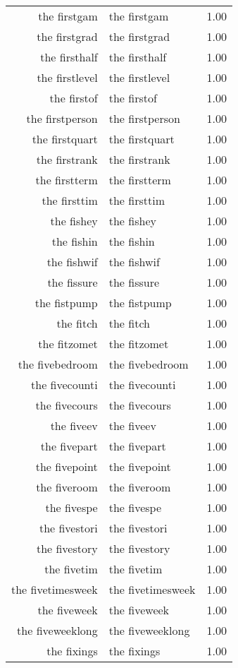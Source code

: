 \begin{table}[ht]
\begin{tabular}{rlr}
  the firstgam & the firstgam & 1.00 \\ 
  the firstgrad & the firstgrad & 1.00 \\ 
  the firsthalf & the firsthalf & 1.00 \\ 
  the firstlevel & the firstlevel & 1.00 \\ 
  the firstof & the firstof & 1.00 \\ 
  the firstperson & the firstperson & 1.00 \\ 
  the firstquart & the firstquart & 1.00 \\ 
  the firstrank & the firstrank & 1.00 \\ 
  the firstterm & the firstterm & 1.00 \\ 
  the firsttim & the firsttim & 1.00 \\ 
  the fishey & the fishey & 1.00 \\ 
  the fishin & the fishin & 1.00 \\ 
  the fishwif & the fishwif & 1.00 \\ 
  the fissure & the fissure & 1.00 \\ 
  the fistpump & the fistpump & 1.00 \\ 
  the fitch & the fitch & 1.00 \\ 
  the fitzomet & the fitzomet & 1.00 \\ 
  the fivebedroom & the fivebedroom & 1.00 \\ 
  the fivecounti & the fivecounti & 1.00 \\ 
  the fivecours & the fivecours & 1.00 \\ 
  the fiveev & the fiveev & 1.00 \\ 
  the fivepart & the fivepart & 1.00 \\ 
  the fivepoint & the fivepoint & 1.00 \\ 
  the fiveroom & the fiveroom & 1.00 \\ 
  the fivespe & the fivespe & 1.00 \\ 
  the fivestori & the fivestori & 1.00 \\ 
  the fivestory & the fivestory & 1.00 \\ 
  the fivetim & the fivetim & 1.00 \\ 
  the fivetimesweek & the fivetimesweek & 1.00 \\ 
  the fiveweek & the fiveweek & 1.00 \\ 
  the fiveweeklong & the fiveweeklong & 1.00 \\ 
  the fixings & the fixings & 1.00 \\ 

\end{tabular}
\end{table}

